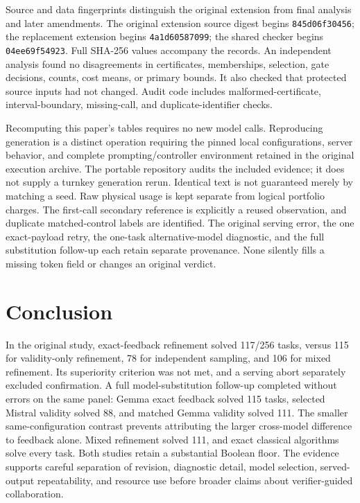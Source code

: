 Source and data fingerprints distinguish the original extension from final analysis and later amendments. The original extension source digest begins \texttt{845d06f30456}; the replacement extension begins \texttt{4a1d60587099}; the shared checker begins \texttt{04ee69f54923}. Full SHA-256 values accompany the records. An independent analysis found no disagreements in certificates, memberships, selection, gate decisions, counts, cost means, or primary bounds. It also checked that protected source inputs had not changed. Audit code includes malformed-certificate, interval-boundary, missing-call, and duplicate-identifier checks.

Recomputing this paper's tables requires no new model calls. Reproducing generation is a distinct operation requiring the pinned local configurations, server behavior, and complete prompting/controller environment retained in the original execution archive. The portable repository audits the included evidence; it does not supply a turnkey generation rerun. Identical text is not guaranteed merely by matching a seed. Raw physical usage is kept separate from logical portfolio charges. The first-call secondary reference is explicitly a reused observation, and duplicate matched-control labels are identified. The original serving error, the one exact-payload retry, the one-task alternative-model diagnostic, and the full substitution follow-up each retain separate provenance. None silently fills a missing token field or changes an original verdict.

\section{Conclusion}

In the original study, exact-feedback refinement solved 117/256 tasks, versus 115 for validity-only refinement, 78 for independent sampling, and 106 for mixed refinement. Its superiority criterion was not met, and a serving abort separately excluded confirmation. A full model-substitution follow-up completed without errors on the same panel: Gemma exact feedback solved 115 tasks, selected Mistral validity solved 88, and matched Gemma validity solved 111. The smaller same-configuration contrast prevents attributing the larger cross-model difference to feedback alone. Mixed refinement solved 111, and exact classical algorithms solve every task. Both studies retain a substantial Boolean floor. The evidence supports careful separation of revision, diagnostic detail, model selection, served-output repeatability, and resource use before broader claims about verifier-guided collaboration.
